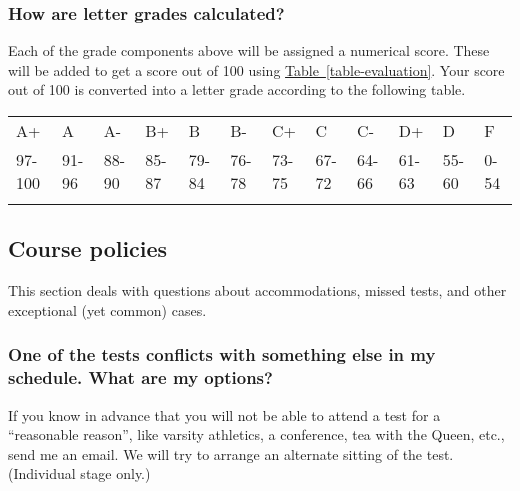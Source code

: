 \documentclass[10pt,]{article}
\newcommand{\hrulethin}  {\noalign{\hrule height 0.04em}}
\begin{document}
\subsubsection[{How are letter grades calculated?}]{How are letter grades calculated?}\label{subsubsection-22}
\hypertarget{p-30}{}%
Each of the grade components above will be assigned a numerical score. These will be added to get a score out of 100 using \hyperref[table-evaluation]{Table~\ref{table-evaluation}}. Your score out of 100 is converted into a letter grade according to the following table.%
\begin{sidebyside}{1}{0}{0}{0}
\begin{sbspanel}{1}
{\centering%
\begin{tabular}{llllllllllll}\hrulethin
A+&A&A-&B+&B&B-&C+&C&C-&D+&D&F\tabularnewline\hrulethin
97-100&91-96&88-90&85-87&79-84&76-78&73-75&67-72&64-66&61-63&55-60&0-54\tabularnewline\hrulethin
\end{tabular}
\par}
\end{sbspanel}
\end{sidebyside}
%
%
\typeout{************************************************}
\typeout{************************************************}
%
\subsection[{Course policies}]{Course policies}\label{section-policy}
\hypertarget{p-31}{}%
This section deals with questions about accommodations, missed tests, and other exceptional (yet common) cases.%
%
%
\typeout{************************************************}
\typeout{************************************************}
%
\subsubsection[{One of the tests conflicts with something else in my schedule. What are my options?}]{One of the tests conflicts with something else in my schedule. What are my options?}\label{subsubsection-23}
\hypertarget{p-32}{}%
If you know in advance that you will not be able to attend a test for a ``reasonable reason'', like varsity athletics, a conference, tea with the Queen, etc.\@, send me an email. We will try to arrange an alternate sitting of the test. (Individual stage only.)%
%
%
\typeout{************************************************}
\typeout{************************************************}
%
\end{document}
